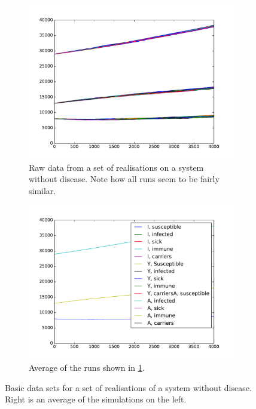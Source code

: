 \documentclass[10pt,a4paper]{article}
\begin{document}
\begin{figure}[h]
	\centering
	\begin{subfigure}{0.45\textwidth}
		\includegraphics[width=\textwidth]{figures/raw_data_disease_free.pdf}
		\caption{Raw data from a set of realisations on a system without disease. Note how all runs seem to be fairly similar.} \label{fig:results:raw_no_disease}
	\end{subfigure}
	\begin{subfigure}{0.45\textwidth}
		\includegraphics[width=\textwidth]{figures/plotted_aves_disease_free.pdf}
		\caption{Average of the runs shown in \cref{fig:results:raw_no_disease}.} \label{fig:results:ave_no_disease}
	\end{subfigure}
	\caption{Basic data sets for a set of realisations of a system without disease. Right is an average of the simulations on the left.} \label{fig:results:no_disease}
\end{figure}
\end{document}
